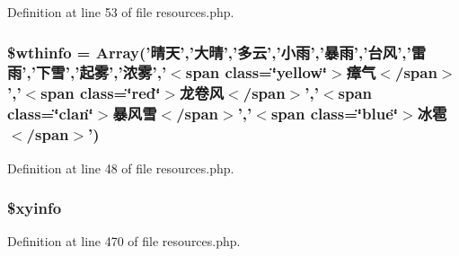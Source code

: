 Definition at line 53 of file resources.\+php.

\hypertarget{resources_8php_a42c20343a70aaec3fcdbace0179e4eb2}{
\subsubsection[{\$wthinfo}]{\setlength{\rightskip}{0pt plus 5cm}\$wthinfo = Array('晴天','大晴','多云','小雨','暴雨','台风','雷雨','下雪','起雾','浓雾','$<$span class=\char`\"{}yellow\char`\"{}$>$瘴气$<$/span$>$','$<$span class=\char`\"{}red\char`\"{}$>$龙卷风$<$/span$>$','$<$span class=\char`\"{}clan\char`\"{}$>$暴风雪$<$/span$>$','$<$span class=\char`\"{}blue\char`\"{}$>$冰雹$<$/span$>$')}}\label{resources_8php_a42c20343a70aaec3fcdbace0179e4eb2}


Definition at line 48 of file resources.\+php.

\hypertarget{resources_8php_aabc8b00fb3b56eab2f2d6ff8e1f0839c}{
\subsubsection[{\$xyinfo}]{\setlength{\rightskip}{0pt plus 5cm}\$xyinfo}}\label{resources_8php_aabc8b00fb3b56eab2f2d6ff8e1f0839c}


Definition at line 470 of file resources.\+php.

